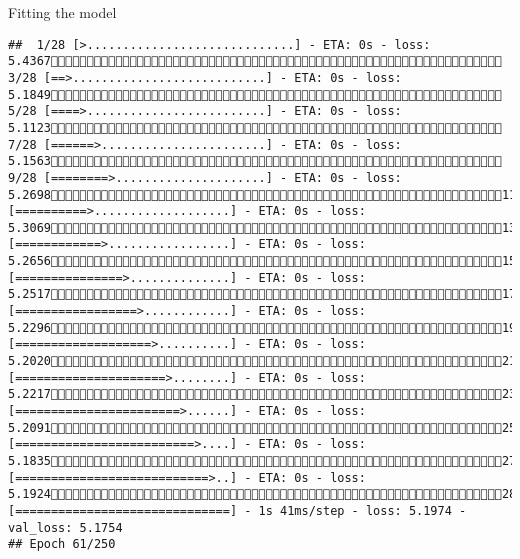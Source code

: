 \documentclass[
  ignorenonframetext,
]{beamer}
\begin{document}
\begin{frame}[fragile]{Fitting the model}
\begin{verbatim}
##  1/28 [>.............................] - ETA: 0s - loss: 5.4367 3/28 [==>...........................] - ETA: 0s - loss: 5.1849 5/28 [====>.........................] - ETA: 0s - loss: 5.1123 7/28 [======>.......................] - ETA: 0s - loss: 5.1563 9/28 [========>.....................] - ETA: 0s - loss: 5.269811/28 [==========>...................] - ETA: 0s - loss: 5.306913/28 [============>.................] - ETA: 0s - loss: 5.265615/28 [===============>..............] - ETA: 0s - loss: 5.251717/28 [=================>............] - ETA: 0s - loss: 5.229619/28 [===================>..........] - ETA: 0s - loss: 5.202021/28 [=====================>........] - ETA: 0s - loss: 5.221723/28 [=======================>......] - ETA: 0s - loss: 5.209125/28 [=========================>....] - ETA: 0s - loss: 5.183527/28 [===========================>..] - ETA: 0s - loss: 5.192428/28 [==============================] - 1s 41ms/step - loss: 5.1974 - val_loss: 5.1754
## Epoch 61/250

\end{verbatim}
\end{frame}
\end{document}
